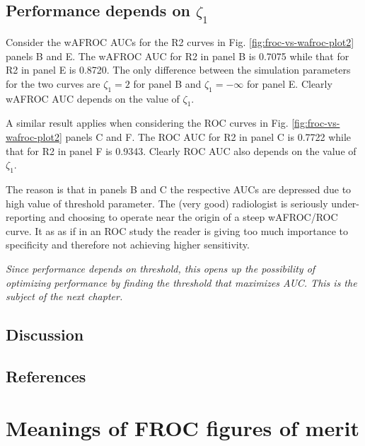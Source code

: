 \documentclass[
]{book}
\begin{document}
\hypertarget{froc-vs-wafroc-peformance-depends-on-zeta1}{%
\section{\texorpdfstring{Performance depends on \(\zeta_1\)}{Performance depends on \textbackslash zeta\_1}}\label{froc-vs-wafroc-peformance-depends-on-zeta1}}

Consider the wAFROC AUCs for the R2 curves in Fig. \ref{fig:froc-vs-wafroc-plot2} panels B and E. The wAFROC AUC for R2 in panel B is 0.7075 while that for R2 in panel E is 0.8720. The only difference between the simulation parameters for the two curves are \(\zeta_1 = 2\) for panel B and \(\zeta_1 = -\infty\) for panel E. Clearly wAFROC AUC depends on the value of \(\zeta_1\).

A similar result applies when considering the ROC curves in Fig. \ref{fig:froc-vs-wafroc-plot2} panels C and F. The ROC AUC for R2 in panel C is 0.7722 while that for R2 in panel F is 0.9343. Clearly ROC AUC also depends on the value of \(\zeta_1\).

The reason is that in panels B and C the respective AUCs are depressed due to high value of threshold parameter. The (very good) radiologist is seriously under-reporting and choosing to operate near the origin of a steep wAFROC/ROC curve. It as as if in an ROC study the reader is giving too much importance to specificity and therefore not achieving higher sensitivity.

\emph{Since performance depends on threshold, this opens up the possibility of optimizing performance by finding the threshold that maximizes AUC. This is the subject of the next chapter.}

\hypertarget{froc-vs-wafroc-Discussion}{%
\section{Discussion}\label{froc-vs-wafroc-Discussion}}

\hypertarget{froc-vs-wafroc-references}{%
\section{References}\label{froc-vs-wafroc-references}}

\hypertarget{froc-meanings}{%
\chapter{Meanings of FROC figures of merit}\label{froc-meanings}}
\end{document}
